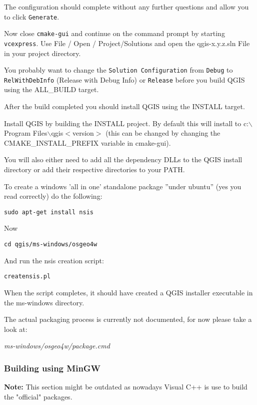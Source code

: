 The configuration should complete without any further questions and allow you to
click \texttt{Generate}.

Now close \texttt{cmake-gui} and continue on the command prompt by starting
\texttt{vcexpress}.  Use File / Open / Project/Solutions and open the
qgis-x.y.z.sln File in your project directory.

You probably want to change the \texttt{Solution Configuration} from \texttt{Debug}
to \texttt{RelWithDebInfo} (Release with Debug Info)  or \texttt{Release} before you
build QGIS using the ALL\_BUILD target.

After the build completed you should install QGIS using the INSTALL target.

Install QGIS by building the INSTALL project. By default this will install to
c:$\backslash$Program Files$\backslash$qgis$<$version$>$ (this can be changed by changing the
CMAKE\_INSTALL\_PREFIX variable in cmake-gui). 

You will also either need to add all the dependency DLLs to the QGIS install
directory or add their respective directories to your PATH.

To create a windows 'all in one' standalone  package ''under ubuntu'' (yes you
read correctly) do the following:

\begin{verbatim}
sudo apt-get install nsis
\end{verbatim}

Now 

\begin{verbatim}
cd qgis/ms-windows/osgeo4w
\end{verbatim}

And run the nsis creation script:

\begin{verbatim}
creatensis.pl
\end{verbatim}

When the script completes, it should have created a QGIS installer executable
in the ms-windows directory.

The actual packaging process is currently not documented, for now please take a
look at:

\textit{ms-windows/osgeo4w/package.cmd}

\hypertarget{toc16}{}
\subsubsection{Building using MinGW}
\textbf{Note:} This section might be outdated as nowadays Visual C++ is use to build
the "official" packages.

